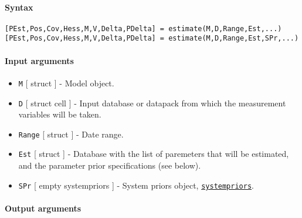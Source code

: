 


	\paragraph{Syntax}\label{syntax}

\begin{verbatim}
[PEst,Pos,Cov,Hess,M,V,Delta,PDelta] = estimate(M,D,Range,Est,...)
[PEst,Pos,Cov,Hess,M,V,Delta,PDelta] = estimate(M,D,Range,Est,SPr,...)
\end{verbatim}

\paragraph{Input arguments}\label{input-arguments}

\begin{itemize}
\item
  \texttt{M} {[} struct {]} - Model object.
\item
  \texttt{D} {[} struct \textbar{} cell {]} - Input database or datapack
  from which the measurement variables will be taken.
\item
  \texttt{Range} {[} struct {]} - Date range.
\item
  \texttt{Est} {[} struct {]} - Database with the list of paremeters
  that will be estimated, and the parameter prior specifications (see
  below).
\item
  \texttt{SPr} {[} empty \textbar{} systempriors {]} - System priors
  object, \href{systempriors/Contents}{\texttt{systempriors}}.
\end{itemize}

\paragraph{Output arguments}\label{output-arguments}

